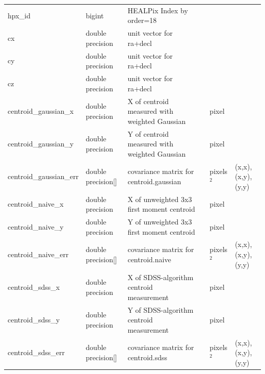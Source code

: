 \documentclass[12pt]{article}
\begin{document}
\begin{table}[thbp]
\begin{center}
{\begin{tabular}{llllll}
hpx\_id & bigint & HEALPix Index by order=18                                &                           &                  &             \\
cx & double precision & unit vector for ra+decl                                  &                           &                  &              \\
cy & double precision & unit vector for ra+decl                                  &                           &                  &              \\
cz & double precision & unit vector for ra+decl                                  &                           &                  &              \\
centroid\_gaussian\_x & double precision & X of centroid measured with weighted Gaussian            &                           & pixel            &             \\
centroid\_gaussian\_y & double precision & Y of centroid measured with weighted Gaussian            &                           & pixel            &             \\
centroid\_gaussian\_err & double precision[] & covariance matrix for centroid.gaussian                  &                           & pixels$^2$         & {(x,x), (x,y), (y,y)}  \\
centroid\_naive\_x & double precision & X of unweighted 3x3 first moment centroid                &                           & pixel            &             \\
centroid\_naive\_y & double precision & Y of unweighted 3x3 first moment centroid                &                           & pixel            &             \\
centroid\_naive\_err & double precision[] & covariance matrix for centroid.naive                     &                           & pixels$^2$         & {(x,x), (x,y), (y,y)}  \\
centroid\_sdss\_x & double precision & X of SDSS-algorithm centroid measurement                 &                           & pixel            &             \\
centroid\_sdss\_y & double precision & Y of SDSS-algorithm centroid measurement                 &                           & pixel            &             \\
centroid\_sdss\_err & double precision[] & covariance matrix for centroid.sdss                      &                           & pixels$^2$         & {(x,x), (x,y), (y,y)}  \\

\end{tabular}}
\end{center}
\end{table}
\end{document}
